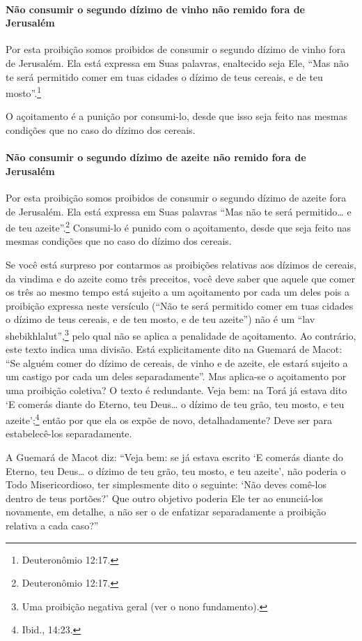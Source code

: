 \paragraph{Não consumir o segundo dízimo de vinho não remido fora de Jerusalém}

Por esta proibição somos proibidos de consumir o segundo dízimo de vinho
fora de Jerusalém. Ela está expressa em Suas palavras, enaltecido seja
Ele, ``Mas não te será permitido comer em tuas cidades o dízimo de teus
cereais, e de teu mosto''.\footnote{Deuteronômio 12:17.}

O açoitamento é a punição por consumi-lo, desde que isso seja feito nas
mesmas condições que no caso do dízimo dos cereais.

\paragraph{Não consumir o segundo dízimo de azeite não remido fora de Jerusalém}

Por esta proibição somos proibidos de consumir o segundo dízimo de
azeite fora de Jerusalém. Ela está expressa em Suas palavras ``Mas não
te será permitido\ldots{} e de teu azeite''.\footnote{Deuteronômio 12:17.} Consumi-lo
é punido com o açoitamento, desde que seja feito nas mesmas condições
que no caso do dízimo dos cereais.

Se você está surpreso por contarmos as proibições relativas aos dízimos
de cereais, da vindima e do azeite como três preceitos, você deve saber
que aquele que comer os três ao mesmo tempo está sujeito a um
açoitamento por cada um deles pois a proibição expressa neste versículo
(``Não te será permitido comer em tuas cidades o dízimo de teus
cereais, e de teu mosto, e de teu azeite'') não é um ``lav
shebikhlalut'',\footnote{Uma proibição negativa geral (ver o nono fundamento).} pelo qual não se aplica a
penalidade de açoitamento. Ao contrário, este texto indica uma divisão.
Está explicitamente dito na Guemará de Macot: ``Se alguém comer do
dízimo de cereais, de vinho e de azeite, ele estará sujeito a um castigo
por cada um deles separadamente''. Mas aplica-se o açoitamento por uma
proibição coletiva? O texto é redundante. Veja bem: na Torá já estava
dito `E comerás diante do Eterno, teu Deus\ldots{} o dízimo de teu grão, teu
mosto, e teu azeite';\footnote{Ibid., 14:23.} então por que ela os expõe de novo,
detalhadamente? Deve ser para estabelecê-los separadamente.

A Guemará de Macot diz: ``Veja bem: se já estava escrito `E comerás
diante do Eterno, teu Deus\ldots{} o dízimo de teu grão, teu mosto, e teu
azeite', não poderia o Todo Misericordioso, ter simplesmente dito o
seguinte: `Não deves comê-los dentro de teus portões?' Que outro
objetivo poderia Ele ter ao enunciá-los novamente, em detalhe, a não ser
o de enfatizar separadamente a proibição relativa a cada caso?''

